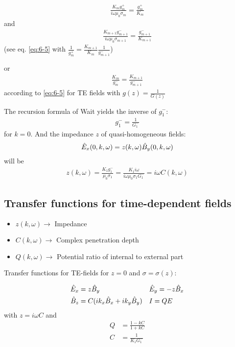 \begin{align*}
\frac{K_mg_m^+}{i\omega\mu_0\sigma_m}=\frac{g_m^+}{K_m}
\end{align*}
and 
\begin{align*}
\frac{K_{m+1}g_{m+1}^-}{i\omega\mu_0\sigma_{m+1}}=\frac{g_{m+1}^-}{K_{m+1}}
\end{align*}
(see eq. \eqref{eq:6-5} with $\frac{1}{g_m^+}=\frac{K_{m+1}}{K_m}\frac{1}{g_{m+1}^-}$)

or
\begin{align*}
\frac{K_m}{g_m^-}=\frac{K_{m+1}}{g_{m+1}^-}
\end{align*}
according to \eqref{eq:6-5} for TE fields with $g(z)=\frac{1}{G(z)}$

The recursion formula of Wait yields the inverse of $g_1^-$:
\begin{align*}
g_1^-=\frac{1}{G_1^-}
\end{align*}
for $k=0$. And the impedance $z$ of quasi-homogeneous fields:
\begin{align*}
\hat{E}_x(0,k,\omega)=z(k,\omega)\hat{B}_y(0,k,\omega)
\end{align*}
will be
\begin{align*}
z(k,\omega)=\frac{K_1g_1^-}{\mu_0\sigma_1}=\frac{K_1i\omega}{i\omega\mu_0\sigma_1G_1^-}=i\omega C(k,\omega)
\end{align*}

\subsection{Transfer functions for time-dependent fields}

\begin{itemize}
\item $z(k,\omega)\rightarrow$ Impedance
\item $C(k,\omega)\rightarrow$ Complex penetration depth
\item $Q(k,\omega)\rightarrow$ Potential ratio of internal to external part
\end{itemize}
Transfer functions for TE-fields for $z=0$ and $\sigma=\sigma(z)$:

\begin{align*}
\hat{E}_x&=z\hat{B}_y && \hat{E}_y=-z\hat{B}_x\\
\hat{B}_z&=C(ik_x\hat{B}_x+ik_y\hat{B}_y) && I=QE\\
\end{align*}
with $z=i\omega C$ and
\begin{equation}
\begin{split}
Q&=\frac{1-kC}{1+kC}\\
C&=\frac{1}{K_1G_1^-}
\end{split}
\end{equation}
